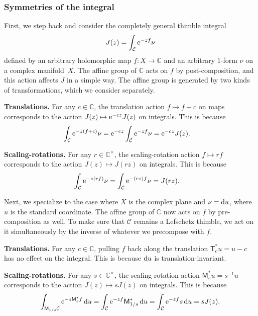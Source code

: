 \documentclass[pdftex]{sigma}
\newcommand{\maps}{\colon}
\newcommand{\C}{\mathbb{C}}
\numberwithin{equation}{section}
\begin{document}
\subsubsection{Symmetries of the integral}\label{sec:int-symm}
First, we step back and consider the completely general thimble integral
\[
J(z) = \int_{\mathcal{C}} {\rm e}^{-zf} \nu
\]
defined by an arbitrary holomorphic map $f \maps X \to \C$ and an arbitrary $1$-form $\nu$ on a complex manifold~$X$. The affine group of $\C$ acts on $f$ by post-composition, and this action affects $J$ in a simple way. The affine group is generated by two kinds of transformations, which we consider separately.

\textbf{Translations.}
For any $c \in \C$, the translation action $f \mapsto f + c$ on maps corresponds to the action
$J(z) \mapsto {\rm e}^{-cz} J(z)$
on integrals. This is because
\begin{align*}
\int_\mathcal{C} {\rm e}^{-z(f + c)} \nu &= {\rm e}^{-cz} \int_\mathcal{C} {\rm e}^{-zf} \nu = {\rm e}^{-cz} J(z).
\end{align*}

\textbf{Scaling-rotations.}
For any $r \in \C^\times$, the scaling-rotation action $f \mapsto rf$ corresponds to the action
$J(z) \mapsto J(rz)$
on integrals. This is because
\begin{align*}
\int_\mathcal{C} {\rm e}^{-z(rf)} \nu & = \int_\mathcal{C} {\rm e}^{-(rz)f} \nu = J(rz).
\end{align*}

Next, we specialize to the case where $X$ is the complex plane and $\nu = {\rm d}u$, where $u$ is the standard coordinate. The affine group of $\C$ now acts on $f$ by pre-composition as well. To make sure that $\mathcal{C}$ remains a Lefschetz thimble, we act on it simultaneously by the inverse of whatever we precompose with $f$.

 \textbf{Translations.}
For any $c \in \C$, pulling $f$ back along the translation $\mathsf{T}_c^* u = u - c$ has no effect on the integral. This is because ${\rm d}u$ is translation-invariant.

\textbf{Scaling-rotations.}
For any $s \in \C^\times$, the scaling-rotation action $\mathsf{M}_s^* u = s^{-1} u$ corresponds to the action
$J(z) \mapsto s J(z)$
on integrals. This is because
\begin{align*}
\int_{\mathsf{M}_{1/s} \mathcal{C}} {\rm e}^{-z \mathsf{M}_s^* f}\, {\rm d}u = \int_\mathcal{C} {\rm e}^{-zf} \mathsf{M}_{1/s}^* \, {\rm d}u
 = \int_\mathcal{C} {\rm e}^{-zf} s \, {\rm d}u
 = s J(z).
\end{align*}
\end{document}
